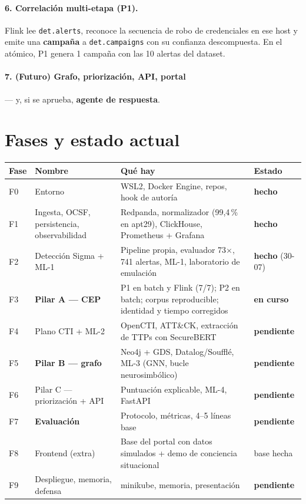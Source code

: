 \documentclass[11pt,a4paper]{article}
\newcommand{\cod}[1]{\texttt{#1}}
\newcommand{\pend}{\textcolor{rojo}{\textbf{pendiente}}}
\newcommand{\hecho}{\textcolor{verde}{\textbf{hecho}}}
\begin{document}
\paragraph{6. Correlación multi-etapa (P1).} Flink lee \cod{det.alerts}, reconoce la secuencia de robo de
credenciales en ese host y emite una \textbf{campaña} a \cod{det.campaigns} con su confianza descompuesta.
En el atómico, P1 genera 1 campaña con las 10 alertas del dataset.

\paragraph{7. (Futuro) Grafo, priorización, API, portal} — y, si se aprueba, \textbf{agente de respuesta}.

\newpage
\section{Fases y estado actual}\label{sec:estado}

\begin{center}
\renewcommand{\arraystretch}{1.2}
\begin{tabularx}{\linewidth}{l l X l}
\toprule
Fase & Nombre & Qué hay & Estado \\
\midrule
F0 & Entorno & WSL2, Docker Engine, repos, hook de autoría & \hecho \\
F1 & Ingesta, OCSF, persistencia, observabilidad & Redpanda, normalizador (99,4\,\% en apt29), ClickHouse, Prometheus + Grafana & \hecho \\
F2 & Detección Sigma + ML-1 & Pipeline propia, evaluador 73$\times$, 741 alertas, ML-1, laboratorio de emulación & \hecho{} (30-07) \\
F3 & \textbf{Pilar A — CEP} & P1 en batch y Flink (7/7); P2 en batch; corpus reproducible; identidad y tiempo corregidos & \textbf{en curso} \\
F4 & Plano CTI + ML-2 & OpenCTI, ATT\&CK, extracción de TTPs con SecureBERT & \pend \\
F5 & \textbf{Pilar B — grafo} & Neo4j + GDS, Datalog/Soufflé, ML-3 (GNN, bucle neurosimbólico) & \pend \\
F6 & Pilar C — priorización + API & Puntuación explicable, ML-4, FastAPI & \pend \\
F7 & \textbf{Evaluación} & Protocolo, métricas, 4–5 líneas base & \pend \\
F8 & Frontend (extra) & Base del portal con datos simulados + demo de conciencia situacional & base hecha \\
F9 & Despliegue, memoria, defensa & minikube, memoria, presentación & \pend \\
\bottomrule
\end{tabularx}
\end{center}
\end{document}
